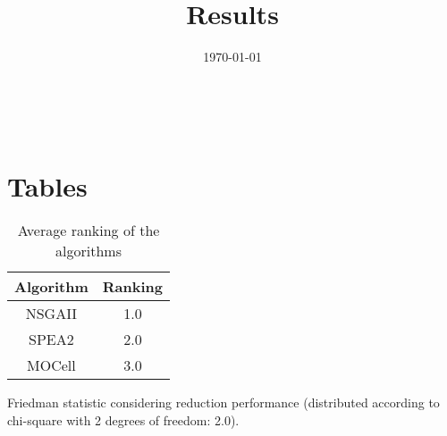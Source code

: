 \documentclass{article}
\title{Results}
\author{}
\date{\today}
\begin{document}
\oddsidemargin 0in \topmargin 0in\maketitle
\
\section{Tables}
\begin{table}[!htp]
\centering
\caption{Average ranking of the algorithms}
\begin{tabular}{c|c}
Algorithm&Ranking\\
\hline
NSGAII&1.0\\
SPEA2&2.0\\
MOCell&3.0\\
\end{tabular}
\end{table}


Friedman statistic considering reduction performance (distributed according to chi-square with 2 degrees of freedom: 2.0).
\end{document}
